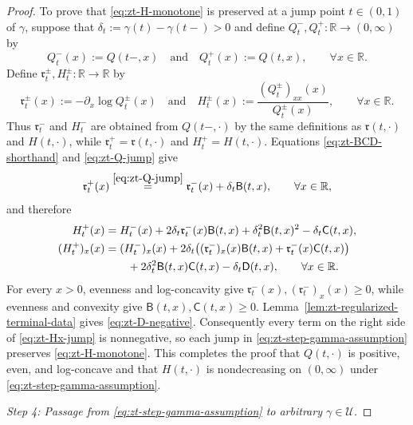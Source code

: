 \documentclass[10pt]{amsart}
\theoremstyle{definition}
\theoremstyle{remark}
\numberwithin{equation}{section}
\newcommand{\R}{\mathbb R}
\newcommand{\1}{\mathbf 1}
\newcommand{\cU}{\mathcal U}
\newcommand{\stackref}[2]{\stackrel{#2}{#1}}
\begin{document}
\begin{proof}
To prove that \eqref{eq:zt-H-monotone} is preserved at a jump point $t\in(0,1)$ of $\gamma$, suppose that $\delta_t:=\gamma(t)-\gamma(t-)>0$ and define $Q_t^-,Q_t^+:\R\to(0,\infty)$ by
\begin{equation*}
 Q_t^-(x):=Q(t-,x)
 \quad\text{and}\quad
 Q_t^+(x):=Q(t,x),
 \qquad \forall x\in\R.
\end{equation*}
Define $\mathfrak r_t^\pm,H_t^\pm:\R\to\R$ by
\begin{equation*}
 \mathfrak r_t^\pm(x):=-\partial_x\log Q_t^\pm(x)\quad\text{and}\quad
 H_t^\pm(x):=\frac{(Q_t^\pm)_{xx}(x)}{Q_t^\pm(x)},
 \qquad \forall x\in\R.
\end{equation*}
Thus $\mathfrak r_t^-$ and $H_t^-$ are obtained from $Q(t-,\cdot)$ by the same definitions as $\mathfrak r(t,\cdot)$ and $H(t,\cdot)$, while $\mathfrak r_t^+=\mathfrak r(t,\cdot)$ and $H_t^+=H(t,\cdot)$. Equations \eqref{eq:zt-BCD-shorthand} and \eqref{eq:zt-Q-jump} give
\begin{equation*}
 \mathfrak r_t^+(x)
 \stackref{=}{\eqref{eq:zt-Q-jump}}
 \mathfrak r_t^-(x)+\delta_t\mathsf B(t,x),
 \qquad \forall x\in\R,
\end{equation*}
and therefore
\begin{align}
 H_t^+(x)
 &=H_t^-(x)+2\delta_t\mathfrak r_t^-(x)\mathsf B(t,x)
 +\delta_t^2\mathsf B(t,x)^2-\delta_t\mathsf C(t,x),            \label{eq:zt-H-jump}\\
 (H_t^+)_x(x)
 &=(H_t^-)_x(x)+2\delta_t\bigl((\mathfrak r_t^-)_x(x)\mathsf B(t,x)
 +\mathfrak r_t^-(x)\mathsf C(t,x)\bigr)\notag\\
 &\qquad+2\delta_t^2\mathsf B(t,x)\mathsf C(t,x)-\delta_t\mathsf D(t,x),
 \qquad \forall x\in\R.                                      \label{eq:zt-Hx-jump}
\end{align}
For every $x>0$, evenness and log-concavity give $\mathfrak r_t^-(x),(\mathfrak r_t^-)_x(x)\geq0$, while evenness and convexity give $\mathsf B(t,x),\mathsf C(t,x)\geq0$. Lemma~\ref{lem:zt-regularized-terminal-data} gives \eqref{eq:zt-D-negative}. Consequently every term on the right side of \eqref{eq:zt-Hx-jump} is nonnegative, so each jump in \eqref{eq:zt-step-gamma-assumption} preserves \eqref{eq:zt-H-monotone}. This completes the proof that $Q(t,\cdot)$ is positive, even, and log-concave and that $H(t,\cdot)$ is nondecreasing on $(0,\infty)$ under \eqref{eq:zt-step-gamma-assumption}.

\smallskip
\noindent\emph{Step 4: Passage from \eqref{eq:zt-step-gamma-assumption} to arbitrary $\gamma\in\cU$.}


\end{proof}
\end{document}
